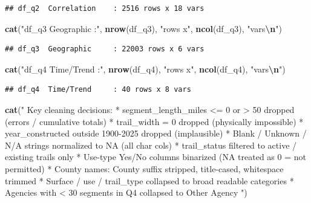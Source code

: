 \documentclass[
]{article}
\newenvironment{Shaded}{\begin{snugshade}}{\end{snugshade}}
\newcommand{\FunctionTok}[1]{\textcolor[rgb]{0.13,0.29,0.53}{\textbf{#1}}}
\newcommand{\NormalTok}[1]{#1}
\newcommand{\SpecialCharTok}[1]{\textcolor[rgb]{0.81,0.36,0.00}{\textbf{#1}}}
\newcommand{\StringTok}[1]{\textcolor[rgb]{0.31,0.60,0.02}{#1}}
\begin{document}
\begin{verbatim}
## df_q2  Correlation    : 2516 rows x 18 vars
\end{verbatim}

\begin{Shaded}
\begin{Highlighting}[]
\FunctionTok{cat}\NormalTok{(}\StringTok{"df\_q3  Geographic     :"}\NormalTok{, }\FunctionTok{nrow}\NormalTok{(df\_q3), }\StringTok{"rows x"}\NormalTok{, }\FunctionTok{ncol}\NormalTok{(df\_q3), }\StringTok{"vars}\SpecialCharTok{\textbackslash{}n}\StringTok{"}\NormalTok{)}
\end{Highlighting}
\end{Shaded}

\begin{verbatim}
## df_q3  Geographic     : 22003 rows x 6 vars
\end{verbatim}

\begin{Shaded}
\begin{Highlighting}[]
\FunctionTok{cat}\NormalTok{(}\StringTok{"df\_q4  Time/Trend     :"}\NormalTok{, }\FunctionTok{nrow}\NormalTok{(df\_q4), }\StringTok{"rows x"}\NormalTok{, }\FunctionTok{ncol}\NormalTok{(df\_q4), }\StringTok{"vars}\SpecialCharTok{\textbackslash{}n}\StringTok{"}\NormalTok{)}
\end{Highlighting}
\end{Shaded}

\begin{verbatim}
## df_q4  Time/Trend     : 40 rows x 8 vars
\end{verbatim}

\begin{Shaded}
\begin{Highlighting}[]
\FunctionTok{cat}\NormalTok{(}\StringTok{"}
\StringTok{Key cleaning decisions:}
\StringTok{  * segment\_length\_miles \textless{}= 0 or \textgreater{} 50 dropped (errors / cumulative totals)}
\StringTok{  * trail\_width = 0 dropped (physically impossible)}
\StringTok{  * year\_constructed outside 1900{-}2025 dropped (implausible)}
\StringTok{  * Blank / \textquotesingle{}Unknown\textquotesingle{} / \textquotesingle{}N/A\textquotesingle{} strings normalized to NA (all char cols)}
\StringTok{  * trail\_status filtered to active / existing trails only}
\StringTok{  * Use{-}type Yes/No columns binarized (NA treated as 0 = not permitted)}
\StringTok{  * County names: \textquotesingle{}County\textquotesingle{} suffix stripped, title{-}cased, whitespace trimmed}
\StringTok{  * Surface / use / trail\_type collapsed to broad readable categories}
\StringTok{  * Agencies with \textless{} 30 segments in Q4 collapsed to \textquotesingle{}Other Agency\textquotesingle{}}
\StringTok{"}\NormalTok{)}
\end{Highlighting}
\end{Shaded}
\end{document}
